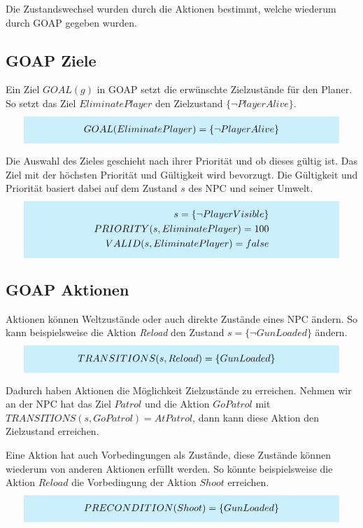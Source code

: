 Die Zustandswechsel wurden durch die Aktionen bestimmt, welche wiederum durch GOAP gegeben wurden.


\subsection{GOAP Ziele}

Ein Ziel $GOAL(g)$ in GOAP setzt die erwünschte Zielzustände für den Planer. So setzt das Ziel $EliminatePlayer$ den Zielzustand $\{\lnot PlayerAlive\}$.
\[
	\highlightbox{0.9\textwidth}{$
		\begin{align*}
			GOAL(EliminatePlayer) = \{\lnot PlayerAlive\}
		\end{align*}
	$}
\]

Die Auswahl des Zieles geschieht nach ihrer Priorität und ob dieses gültig ist. Das Ziel mit der höchsten Priorität und Gültigkeit wird bevorzugt. Die Gültigkeit und Priorität basiert dabei auf dem Zustand $s$ des NPC und seiner Umwelt.
\[
	\highlightbox{0.9\textwidth}{$
		\begin{align*}
			s = \{\lnot PlayerVisible\} \\
			PRIORITY(s,EliminatePlayer) = 100 \\
			VALID(s,EliminatePlayer) = false
		\end{align*}
	$}
\]


\subsection{GOAP Aktionen}

Aktionen können Weltzustände oder auch direkte Zustände eines NPC ändern. So kann beispielsweise die Aktion \textit{Reload} den Zustand $s = \{\lnot GunLoaded\}$ ändern.
\[
	\highlightbox{0.9\textwidth}{$
		\begin{align*}
			TRANSITIONS(s,Reload) &= \{GunLoaded\}
		\end{align*}
	$}
\]

Dadurch haben Aktionen die Möglichkeit Zielzustände zu erreichen. Nehmen wir an der NPC hat das Ziel $Patrol$ und die Aktion $GoPatrol$ mit $TRANSITIONS(s,GoPatrol) = {AtPatrol}$, dann kann diese Aktion den Zielzustand erreichen.

Eine Aktion hat auch Vorbedingungen als Zustände, diese Zustände können wiederum von anderen Aktionen erfüllt werden. So könnte beispielsweise die Aktion $Reload$ die Vorbedingung der Aktion $Shoot$ erreichen.
\[
	\highlightbox{0.9\textwidth}{$
		\begin{align*}
			PRECONDITION(Shoot) = \{GunLoaded\}
		\end{align*}
	$}
\]

